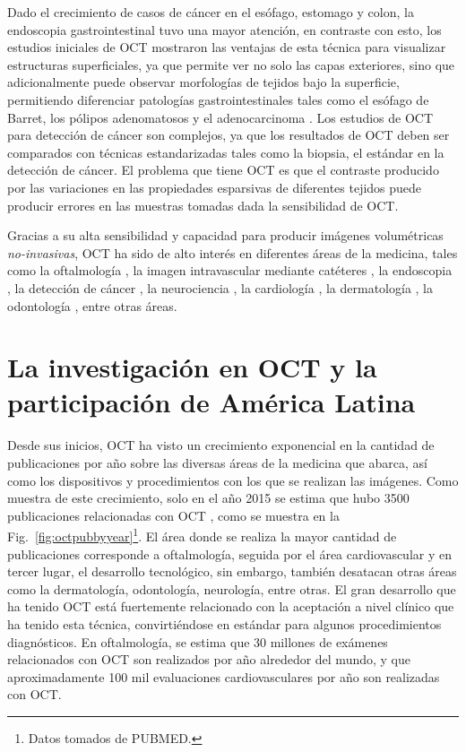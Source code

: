 Dado el crecimiento de casos de cáncer en el esófago, estomago y colon, la endoscopia gastrointestinal tuvo una mayor atención, en contraste con esto, los estudios iniciales de OCT mostraron las ventajas de esta técnica para visualizar estructuras superficiales, ya que permite ver no solo las capas exteriores, sino que adicionalmente puede observar morfologías de tejidos bajo la superficie, permitiendo diferenciar patologías gastrointestinales tales como el esófago de Barret, los pólipos adenomatosos y el adenocarcinoma \cite{Bouma1999, Sergeev1997, Rollins1999, Jackle2000, Jackle2000_2, Sivak2000}. Los estudios de OCT para detección de cáncer son complejos, ya que los resultados de OCT deben ser comparados con técnicas estandarizadas tales como la biopsia, el estándar en la detección de cáncer. El problema que tiene OCT es que el contraste producido por las variaciones en las propiedades esparsivas de diferentes tejidos puede producir errores en las muestras tomadas dada la sensibilidad de OCT.

Gracias a su alta sensibilidad y capacidad para producir imágenes volumétricas \emph{no-invasivas}, OCT ha sido de alto interés en diferentes áreas de la medicina, tales como la oftalmología \cite{Schuman1995, Swanson1993, Puliafito1995, Hee1995, Hee1995_2}, la imagen intravascular mediante catéteres \cite{Grube2002, Jang2002, Bouma2003}, la endoscopia \cite{Tearney1997,Feldchtein1998,Rollins1999}, la detección de cáncer \cite{Sergeev1997,Jackle2000}, la neurociencia \cite{Chen2009,Srinivasan2009,Lee2011}, la cardiología \cite{Li2012,Gu2012,Yazdanfar1997}, la dermatología \cite{Welzel1998,Gambichler2007,Blatter2012}, la odontología \cite{Otis2004,Melo2005,Bakhsh2011}, entre otras áreas.

\section{La investigación en OCT y la participación de América Latina}

Desde sus inicios, OCT ha visto un crecimiento exponencial en la cantidad de publicaciones por año sobre las diversas áreas de la medicina que abarca, así como los dispositivos y procedimientos con los que se realizan las imágenes. Como muestra de este crecimiento, solo en el año 2015 se estima que hubo 3500 publicaciones relacionadas con OCT \cite{Fujimoto2016}, como se muestra en la Fig.~\ref{fig:octpubbyyear}\footnote{Datos tomados de PUBMED.}. El área donde se realiza la mayor cantidad de publicaciones corresponde a oftalmología, seguida por el área cardiovascular y en tercer lugar, el desarrollo tecnológico, sin embargo, también desatacan otras áreas como la dermatología, odontología, neurología, entre otras. El gran desarrollo que ha tenido OCT está fuertemente relacionado con la aceptación a nivel clínico que ha tenido esta técnica, convirtiéndose en estándar para algunos procedimientos diagnósticos. En oftalmología, se estima que 30 millones de exámenes relacionados con OCT son realizados por año alrededor del mundo, y que aproximadamente 100 mil evaluaciones cardiovasculares por año son realizadas con OCT. 

